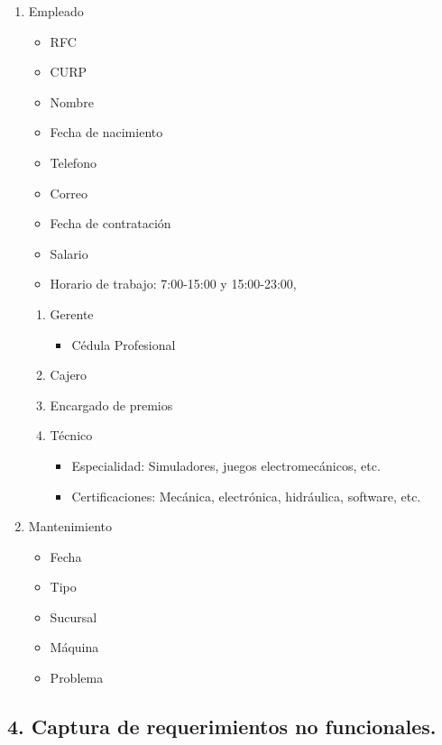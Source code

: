 \begin{enumerate}
    \item Empleado
    \begin{itemize}
        \item RFC
        \item CURP
        \item Nombre
        \item Fecha de nacimiento
        \item Telefono
        \item Correo
        \item Fecha de contratación
        \item Salario
        \item Horario de trabajo: 7:00-15:00 y 15:00-23:00,
    \end{itemize}
    \begin{enumerate}
    \item Gerente
      \begin{itemize}
        \item Cédula Profesional
        \end{itemize}
        \item Cajero
        \item Encargado de premios
        \item Técnico
        \begin{itemize}
            \item Especialidad: Simuladores, juegos electromecánicos, etc.
            \item Certificaciones: Mecánica, electrónica, hidráulica, software, etc.
        \end{itemize}
    \end{enumerate}
    \item Mantenimiento
    \begin{itemize}
        \item Fecha
        \item Tipo
        \item Sucursal
        \item Máquina
        \item Problema
    \end{itemize}

\end{enumerate}

\subsection*{4. Captura de requerimientos no funcionales.}

